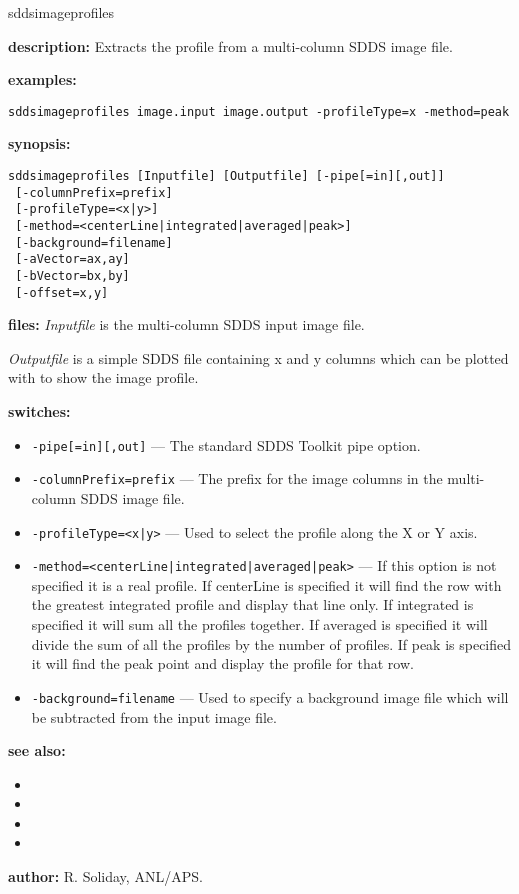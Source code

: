 \begin{sddsprog}{sddsimageprofiles}
  \item \textbf{description:} Extracts the profile from a multi-column SDDS image file.
  \item \textbf{examples:}
    \begin{verbatim}
sddsimageprofiles image.input image.output -profileType=x -method=peak
    \end{verbatim}
  \item \textbf{synopsis:}
    \begin{verbatim}
sddsimageprofiles [Inputfile] [Outputfile] [-pipe[=in][,out]]
 [-columnPrefix=prefix]
 [-profileType=<x|y>]
 [-method=<centerLine|integrated|averaged|peak>]
 [-background=filename]
 [-aVector=ax,ay]
 [-bVector=bx,by]
 [-offset=x,y]
    \end{verbatim}
  \item \textbf{files:}
    \emph{Inputfile} is the multi-column SDDS input image file.

    \emph{Outputfile} is a simple SDDS file containing x and y columns which can be plotted with  to show the image profile.
  \item \textbf{switches:}
    \begin{itemize}
      \item {\tt -pipe[=in][,out]} --- The standard SDDS Toolkit pipe option.
      \item {\tt -columnPrefix=prefix} --- The prefix for the image columns in the multi-column SDDS image file.
      \item {\tt -profileType=<x|y>} --- Used to select the profile along the X or Y axis.
      \item {\tt -method=<centerLine|integrated|averaged|peak>} --- If this option is not specified it is a real profile. If centerLine is specified it will find the row with the greatest integrated profile and display that line only. If integrated is specified it will sum all the profiles together. If averaged is specified it will divide the sum of all the profiles by the number of profiles. If peak is specified it will find the peak point and display the profile for that row.
      \item {\tt -background=filename} --- Used to specify a background image file which will be subtracted from the input image file.
    \end{itemize}
  \item \textbf{see also:}
    \begin{itemize}
      \item {}
      \item {}
      \item {}
      \item {}
    \end{itemize}
  \item \textbf{author:} R. Soliday, ANL/APS.
\end{sddsprog}

